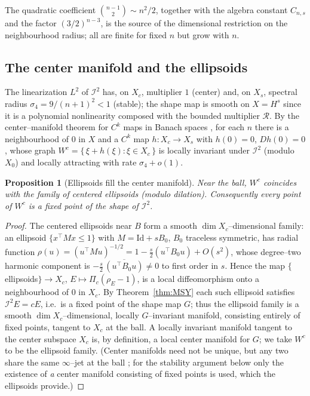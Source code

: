 \documentclass[11pt,reqno]{amsart}
\theoremstyle{plain}
\newtheorem{proposition}[theorem]{Proposition}
\theoremstyle{definition}
\newcommand{\Rad}{\mathcal{R}}
\newcommand{\IB}{\mathcal{I}}
\begin{document}
The quadratic coefficient $\binom{n-1}{2}\sim n^2/2$, together with the algebra
constant $C_{n,s}$ and the factor $(3/2)^{n-3}$, is the source of the
dimensional restriction on the neighbourhood radius; all are finite for fixed
$n$ but grow with $n$.

\subsection{The center manifold and the ellipsoids}
The linearization $L^2$ of $\IB^2$ has, on $X_c$, multiplier $1$ (center) and,
on $X_s$, spectral radius $\sigma_4=9/(n+1)^2<1$ (stable); the shape map is
smooth on $X=H^s$ since it is a polynomial nonlinearity composed with the
bounded multiplier $\Rad$. By the center--manifold theorem for $C^k$ maps in
Banach spaces \cite{VanderbauwhedeIooss1992,HPS1977}, for each $n$ there is a
neighbourhood of $0$ in $X$ and a $C^k$ map $h:X_c\to X_s$ with $h(0)=0$,
$Dh(0)=0$, whose graph $W^c=\{\,\xi+h(\xi):\xi\in X_c\,\}$ is locally invariant
under $\IB^2$ (modulo $X_0$) and locally attracting with rate $\sigma_4+o(1)$.

\begin{proposition}[Ellipsoids fill the center manifold]\label{prop:center-mfld}
Near the ball, $W^c$ coincides with the family of centered ellipsoids
(modulo dilation). Consequently every point of $W^c$ is a fixed point of the
shape of $\IB^2$.
\end{proposition}

\begin{proof}
The centered ellipsoids near $B$ form a smooth $\dim X_c$--dimensional family:
an ellipsoid $\{x^\top M x\le1\}$ with $M=\mathrm{Id}+sB_0$, $B_0$ traceless
symmetric, has radial function $\rho(u)=(u^\top M u)^{-1/2}
=1-\tfrac{s}{2}(u^\top B_0 u)+O(s^2)$, whose degree--two harmonic component is
$-\tfrac{s}{2}\,\overline{(u^\top B_0 u)}\neq0$ to first order in $s$. Hence the
map $\{$ellipsoids$\}\to X_c$, $E\mapsto \Pi_c(\rho_E-1)$, is a local
diffeomorphism onto a neighbourhood of $0$ in $X_c$. By
Theorem~\ref{thm:MSY} each such ellipsoid satisfies $\IB^2E=cE$, i.e.\ is a
fixed point of the shape map $G$; thus the ellipsoid family is a smooth
$\dim X_c$--dimensional, locally $G$--invariant manifold, consisting entirely of
fixed points, tangent to $X_c$ at the ball. A locally invariant manifold
tangent to the center subspace $X_c$ is, by definition, a local center manifold
for $G$; we take $W^c$ to be the ellipsoid family. (Center manifolds need not be
unique, but any two share the same $\infty$--jet at the ball
\cite{VanderbauwhedeIooss1992}; for the stability argument below only the
existence of \emph{a} center manifold consisting of fixed points is used, which
the ellipsoids provide.)
\end{proof}
\end{document}
